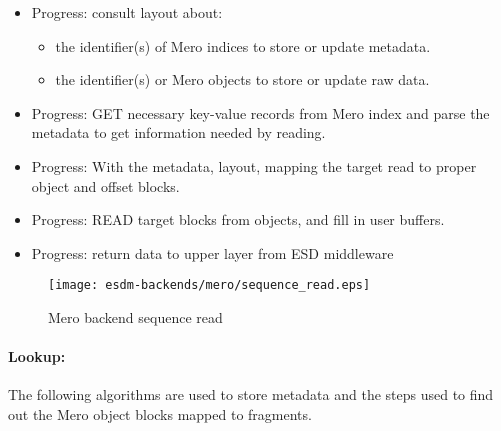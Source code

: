 \begin{itemize}
	\item Progress: consult layout about:
	\begin{itemize}
		\item the identifier(s) of Mero indices to store or update metadata.
		\item the identifier(s) or Mero objects to store or update raw data.
	\end{itemize}
	\item Progress: GET necessary key-value records from Mero index and parse the %
			metadata to get information needed by reading.
	\item Progress: With the metadata, layout, mapping the target read to proper object
			and offset blocks.
	\item Progress: READ target blocks from objects, and fill in user buffers.
	\item Progress: return data to upper layer from ESD middleware
\end{itemize}
\begin{figure}
	\centering
	\texttt{[image: esdm-backends/mero/sequence\_read.eps]}
	\caption{Mero backend sequence read}
	\label{fig:mero backend sequence read}
\end{figure}



\paragraph{Lookup:}

The following algorithms are used to store metadata and the steps used to
find out the Mero object blocks mapped to fragments.

